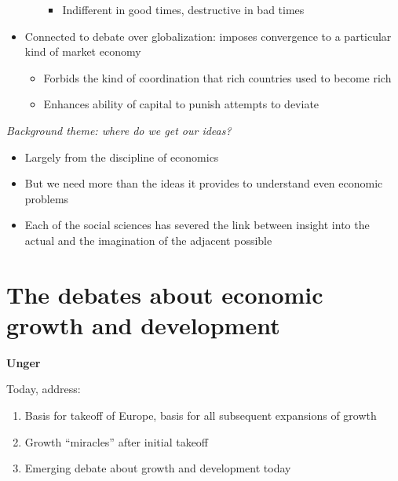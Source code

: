 \begin{itemize}
\begin{itemize}
    \begin{itemize}
    \tightlist
    \item
      Indifferent in good times, destructive in bad times
    \end{itemize}
  \end{itemize}
\item
  Connected to debate over globalization: imposes convergence to a
  particular kind of market economy

  \begin{itemize}
  \tightlist
  \item
    Forbids the kind of coordination that rich countries used to become
    rich
  \item
    Enhances ability of capital to punish attempts to deviate
  \end{itemize}
\end{itemize}

\emph{Background theme: where do we get our ideas?}

\begin{itemize}
\tightlist
\item
  Largely from the discipline of economics
\item
  But we need more than the ideas it provides to understand even
  economic problems
\item
  Each of the social sciences has severed the link between insight into
  the actual and the imagination of the adjacent possible
\end{itemize}

\hypertarget{the-debates-about-economic-growth-and-development}{%
\section{The debates about economic growth and
development}\label{the-debates-about-economic-growth-and-development}}

\textbf{Unger}

Today, address:

\begin{enumerate}
\def\labelenumi{\arabic{enumi}.}
\tightlist
\item
  Basis for takeoff of Europe, basis for all subsequent expansions of
  growth
\item
  Growth ``miracles'' after initial takeoff
\item
  Emerging debate about growth and development today
\end{enumerate}

